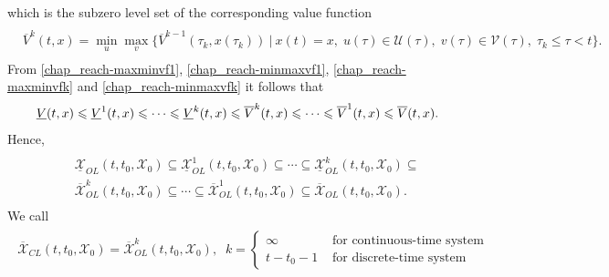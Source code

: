 \documentclass[letterpaper,10pt,english]{sphinxmanual}
\begin{document}
which is the subzero level set of the corresponding value function
\label{chap_reach:equation-minmaxvfk}\begin{gather}
\begin{split}\begin{aligned}
\overline{V}^k(t, x) = \min_u\max_v\{\overline{V}^{k-1}(\tau_k, x(\tau_k)) ~|~ x(t)=x, \;
u(\tau)\in{\mathcal U}(\tau), \; v(\tau)\in{\mathcal V}(\tau), \; \tau_k\leqslant\tau<t\}.
\end{aligned}\end{split}\label{chap_reach-minmaxvfk}
\end{gather}
From \eqref{chap_reach-maxminvf1}, \eqref{chap_reach-minmaxvf1}, \eqref{chap_reach-maxminvfk} and \eqref{chap_reach-minmaxvfk} it
follows that
\begin{gather}
\begin{split}\underline{V}(t, x) \leqslant\underline{V}^1(t, x)\leqslant\cdots
\leqslant\underline{V}^k(t, x) \leqslant\overline{V}^k(t, x) \leqslant\cdots
\leqslant\overline{V}^1(t, x) \leqslant\overline{V}(t, x) .\end{split}\notag
\end{gather}
Hence,
\label{chap_reach:equation-olrsinclusion}\begin{gather}
\begin{split}\begin{aligned}
&&\underline{{\mathcal X}}_{OL}(t, t_0, {\mathcal X}_0) \subseteq \underline{{\mathcal X}}_{OL}^1(t, t_0, {\mathcal X}_0) \subseteq \cdots
\subseteq \underline{{\mathcal X}}_{OL}^k(t, t_0, {\mathcal X}_0) \subseteq \nonumber \\
&&\overline{{\mathcal X}}_{OL}^k(t, t_0, {\mathcal X}_0) \subseteq \cdots \subseteq \overline{{\mathcal X}}_{OL}^1(t, t_0, {\mathcal X}_0)
\subseteq \overline{{\mathcal X}}_{OL}(t, t_0, {\mathcal X}_0) .
\end{aligned}\end{split}\label{chap_reach-olrsinclusion}
\end{gather}
We call
\label{chap_reach:equation-maxminclrs}\begin{gather}
\begin{split}\overline{{\mathcal X}}_{CL}(t, t_0, {\mathcal X}_0) = \overline{{\mathcal X}}_{OL}^k(t, t_0, {\mathcal X}_0), \;\;
k = \left\{\begin{array}{ll}
\infty & \mbox{ for continuous-time system}\\
t-t_0-1 & \mbox{ for discrete-time system}\end{array}\right.\end{split}\label{chap_reach-maxminclrs}
\end{gather}
\end{document}
